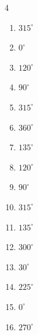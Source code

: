 \begin{multicols}{4}
\begin{enumerate}
  \item $\displaystyle 315^{\circ}$

  \item $\displaystyle 0^{\circ}$
        \phantom{$\displaystyle =0$}

  \item $\displaystyle 120^{\circ}$

  \item $\displaystyle 90^{\circ}$

  \item $\displaystyle 315^{\circ}$

  \item $\displaystyle 360^{\circ}$
        \phantom{$\displaystyle =2\pi$}

  \item $\displaystyle 135^{\circ}$

  \item $\displaystyle 120^{\circ}$

  \item $\displaystyle 90^{\circ}$

  \item $\displaystyle 315^{\circ}$

  \item $\displaystyle 135^{\circ}$

  \item $\displaystyle 300^{\circ}$

  \item $\displaystyle 30^{\circ}$

\columnbreak %

  \item $\displaystyle 225^{\circ}$

  \item $\displaystyle 0^{\circ}$
        \phantom{$\displaystyle =0$}

  \item $\displaystyle 270^{\circ}$


\end{enumerate}
\end{multicols}
